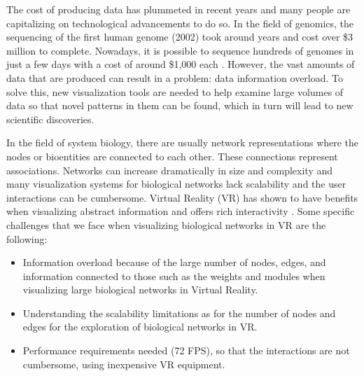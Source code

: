 
The cost of producing data has plummeted in recent years and many people are capitalizing on technological advancements to do so. In the field of genomics, the sequencing of the first human genome (2002) took around years and cost over \$3 million to complete. Nowadays, it is possible to sequence hundreds of genomes in just a few days with a cost of around \$1,000 each \cite{big_biological_impacts_bd}. However, the vast amounts of data that are produced can result in a problem: data information overload. To solve this, new visualization tools are needed to help examine large volumes of data so that novel patterns in them can be found, which in turn will lead to new scientific discoveries.



In the field of system biology, there are usually network representations where the nodes or bioentities are connected to each other. These connections represent associations. Networks can increase dramatically in size and complexity and many visualization systems for biological networks lack scalability and the user interactions can be cumbersome. Virtual Reality (VR) has shown to have benefits when visualizing abstract information and offers rich interactivity \cite{zhang_paciorkowski_craig_cui_2019}. Some specific challenges that we face when visualizing biological networks in VR are the following:
\begin{itemize}
  \item Information overload because of the large number of nodes, edges, and information connected to those such as the weights and modules when visualizing large biological networks in Virtual Reality.
  \item Understanding the scalability limitations as for the number of nodes and edges for the exploration of biological networks in VR.
  \item Performance requirements needed (72 FPS), so that the interactions are not cumbersome, using inexpensive VR equipment.
\end{itemize}

